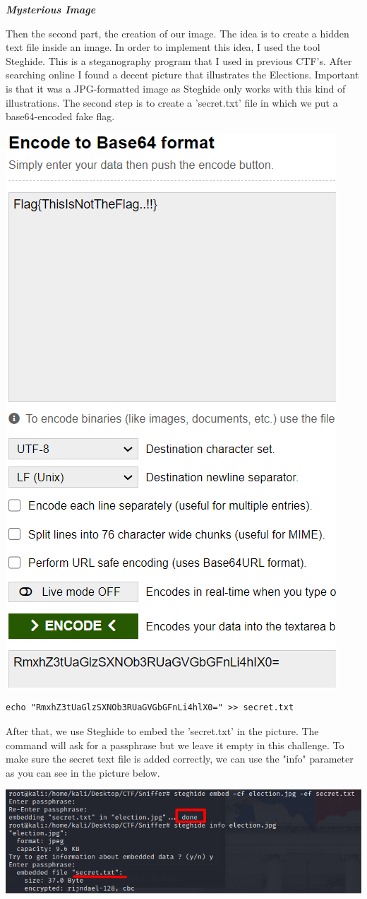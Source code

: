 \documentclass[../main.tex]{subfiles}
\begin{document}
\pagebreak
\textbf{\textit{Mysterious Image}}

Then the second part, the creation of our image. The idea is to create a hidden text file inside an image. In order to implement this idea, I used the tool Steghide. This is a steganography program that I used in previous CTF's. After searching online I found a decent picture that illustrates the Elections. Important is that it was a JPG-formatted image as Steghide only works with this kind of illustrations. The second step is to create a 'secret.txt' file in which we put a base64-encoded fake flag. 

\begin{center}
\includegraphics[width=0.5\linewidth]{images/Robbe/sniffer_3.png}
\end{center}
\begin{lstlisting}
echo "RmxhZ3tUaGlzSXNOb3RUaGVGbGFnLi4hlX0=" >> secret.txt
\end{lstlisting}

\pagebreak
After that, we use Steghide to embed the 'secret.txt' in the picture. The command will ask for a passphrase but we leave it empty in this challenge. To make sure the secret text file is added correctly, we can use the "info" parameter as you can see in the picture below.

\includegraphics[width=\linewidth]{images/Robbe/sniffer_4.png}
\end{document}
